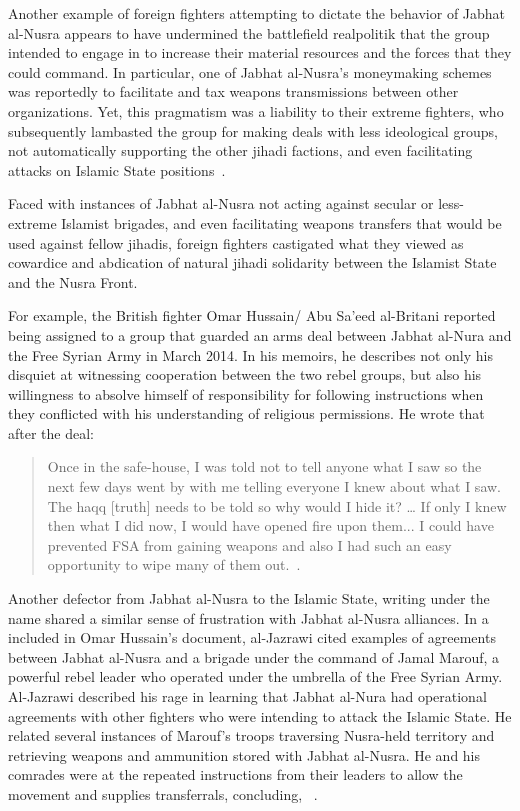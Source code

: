 Another example of foreign fighters attempting to dictate the behavior of Jabhat al-Nusra appears to have undermined the battlefield realpolitik that the group intended to engage in to increase their material resources and the forces that they could command. In particular, one of Jabhat al-Nusra's moneymaking schemes was reportedly to facilitate and tax weapons transmissions between other organizations. Yet, this pragmatism was a liability to their extreme fighters, who subsequently lambasted the group for making deals with less ideological groups, not automatically supporting the other jihadi factions, and even facilitating attacks on Islamic State positions~\autocite{hussein2015exposing, sudani2015days}. 

Faced with instances of Jabhat al-Nusra not acting against secular or less-extreme Islamist brigades, and even facilitating weapons transfers that would be used against fellow jihadis, foreign fighters castigated what they viewed as cowardice and abdication of natural jihadi solidarity between the Islamist State and the Nusra Front. 

For example, the British fighter Omar Hussain/ Abu Sa'eed al-Britani reported being assigned to a group that guarded an arms deal between Jabhat al-Nura and the Free Syrian Army in March 2014. In his memoirs, he describes not only his disquiet at witnessing cooperation between the two rebel groups, but also his willingness to absolve himself of responsibility for following instructions when they conflicted with his understanding of religious permissions. He wrote that after the deal:

\begin{quote} Once in the safe-house, I was told not to tell anyone what I saw so the next few days went by with me telling everyone I knew about what I saw. The haqq [truth] needs to be told so why would I hide it? … If only I knew then what I did now, I would have opened fire upon them... I could have prevented FSA from gaining weapons and also I had such an easy opportunity to wipe many of them out.~\autocite{hussein2015exposing}.\end{quote}

Another defector from Jabhat al-Nusra to the Islamic State, writing under the name  shared a similar sense of frustration with Jabhat al-Nusra alliances. In a  included in Omar Hussain's  document, al-Jazrawi cited examples of agreements between Jabhat al-Nusra and a brigade under the command of Jamal Marouf, a powerful rebel leader who operated under the umbrella of the Free Syrian Army.  Al-Jazrawi described his rage in learning that Jabhat al-Nura had operational agreements with other fighters who were intending to attack the Islamic State. He related several instances of Marouf's troops traversing Nusra-held territory and retrieving weapons and ammunition stored with Jabhat al-Nusra. He and his comrades were  at the repeated instructions from their leaders to allow the movement and supplies transferrals, concluding, ~\autocite{jazrawt2015exposing}.

